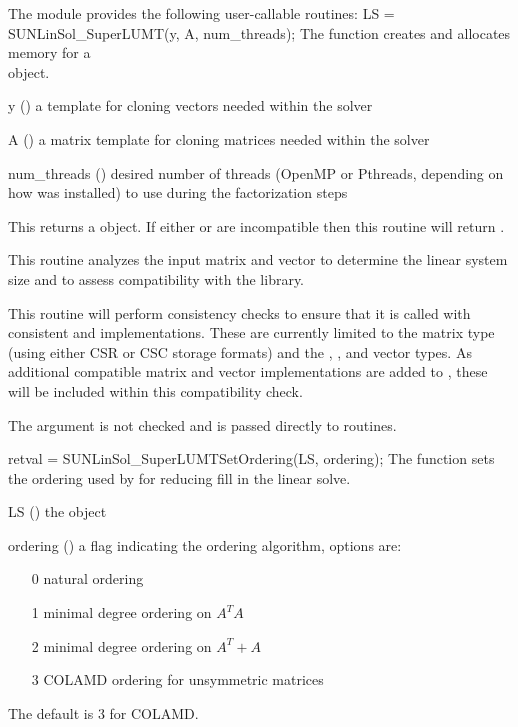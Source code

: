 The module {\sunlinsolslumt} provides the following user-callable routines: 
{
  LS = SUNLinSol\_SuperLUMT(y, A, num\_threads);
}
{
  The function  creates and allocates memory for a
  \\ \noindent {\sunlinsolslumt} object.
}
{
  \begin{args}
  \item[y] ()
    a template for cloning vectors needed within the solver
  \item[A] ()
    a {\sunmatsparse} matrix template for cloning matrices needed
    within the solver 
  \item[num\_threads] ()
    desired number of threads (OpenMP or Pthreads, depending on how
    {\superlumt} was installed) to use during the factorization steps
  \end{args}
}
{
  This returns a  object.  If either  or
   are incompatible then this routine will return .
}
{
  This routine analyzes the input matrix and vector to determine the
  linear system size and to assess compatibility with the {\superlumt}
  library.

  This routine will perform consistency checks to ensure that it is
  called with consistent {\nvector} and {\sunmatrix} implementations.
  These are currently limited to the {\sunmatsparse} matrix type
  (using either CSR or CSC storage formats) and the {\nvecs},
  {\nvecopenmp}, and {\nvecpthreads} vector types.  As additional
  compatible matrix and vector implementations are added to
  {\sundials}, these will be included within this compatibility
  check.

  The  argument is not checked and is passed directly
  to {\superlumt} routines. 
}
{
  retval = SUNLinSol\_SuperLUMTSetOrdering(LS, ordering);
}
{
  The function  sets the ordering
  used by {\superlumt} for reducing fill in the linear solve.
}
{
  \begin{args}[ordering]
  \item[LS] ()
    the {\sunlinsolslumt} object
  \item[ordering] ()
    a flag indicating the ordering algorithm, options are:
    \begin{itemize}
    \item[0] natural ordering
    \item[1] minimal degree ordering on $A^TA$
    \item[2] minimal degree ordering on $A^T+A$
    \item[3] COLAMD ordering for unsymmetric matrices
    \end{itemize}
    The default is 3 for COLAMD.
  \end{args}
}
